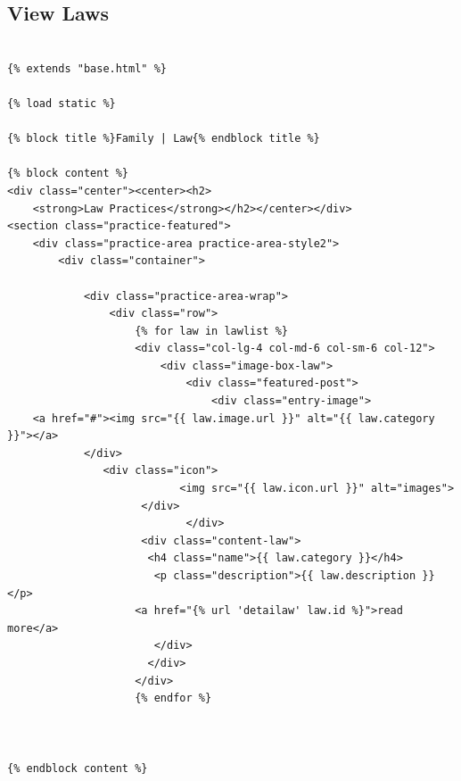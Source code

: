 \subsection{View Laws}
\begin{verbatim}

{% extends "base.html" %}

{% load static %}

{% block title %}Family | Law{% endblock title %}

{% block content %}
<div class="center"><center><h2>
	<strong>Law Practices</strong></h2></center></div>
<section class="practice-featured">
    <div class="practice-area practice-area-style2">
        <div class="container">

            <div class="practice-area-wrap">
                <div class="row">
                    {% for law in lawlist %}
                    <div class="col-lg-4 col-md-6 col-sm-6 col-12">
                        <div class="image-box-law">
                            <div class="featured-post">
                                <div class="entry-image">
	<a href="#"><img src="{{ law.image.url }}" alt="{{ law.category }}"></a>
            </div>
               <div class="icon">
                           <img src="{{ law.icon.url }}" alt="images">
                     </div>
                            </div>
                     <div class="content-law">
                      <h4 class="name">{{ law.category }}</h4>
                       <p class="description">{{ law.description }}</p>
                    <a href="{% url 'detailaw' law.id %}">read more</a>
                       </div>
                      </div>
                    </div>
                    {% endfor %}
            

                    
{% endblock content %}


\end{verbatim}




